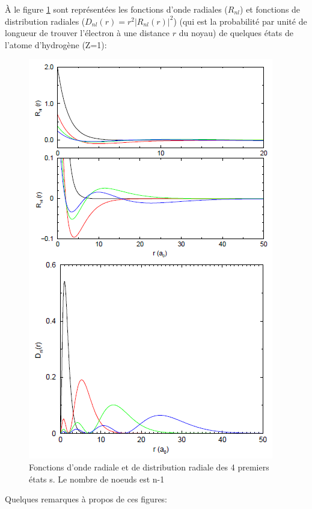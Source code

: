 À le figure \ref{fig:fcx_rad_1} sont représentées les fonctions d'onde radiales ($R_{nl}$) et fonctions de distribution radiales ($D_{nl}(r)=r^2|R_{nl}(r)|^2$) (qui est la probabilité par unité de longueur de trouver l'électron à une distance $r$ du noyau) de quelques états de l'atome d'hydrogène (Z=1):
\begin{figure}[tph]
    \centering
    \includegraphics[scale=0.8]{Images2/ex.PNG}
    \caption{Fonctions d'onde radiale et de distribution radiale des 4 premiers états s. Le nombre de noeuds est n-1}
    \label{fig:fcx_rad_1}
\end{figure}
Quelques remarques à propos de ces figures: 

